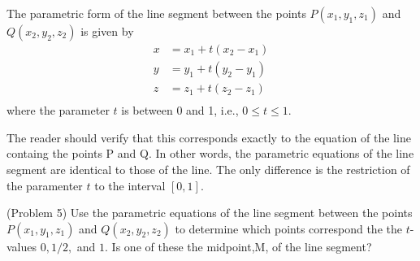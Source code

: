 \documentclass[handout]{ximera}
\begin{document}
\begin{definition}
The parametric form of the line segment between the points $P(x_1, y_1, z_1)$ and $Q(x_2, y_2, z_2)$
is given by
\begin{align*}
x &= x_1 + t(x_2 - x_1)\\
y &= y_1 + t(y_2 - y_1)\\
z &= z_1 + t(z_2 - z_1)\\
\end{align*}
where the parameter $t$ is between 0 and 1, i.e., $0 \leq t \leq 1$.
\end{definition}

The reader should verify that this corresponds exactly to the equation of the line containg the points P and Q.
In other words, the parametric equations of the line segment are identical to those of the line. 
The only difference is the restriction of the paramenter $t$ to the interval $[0,1]$. 

\begin{problem}(Problem 5)
Use the parametric equations of the line segment between the points  $P(x_1, y_1, z_1)$ and $Q(x_2, y_2, z_2)$
to determine which points correspond the the $t$-values $0, 1/2, $ and $1$. 
Is one of these the midpoint,M, of the line segment?
\end{problem}
 
\end{document}
